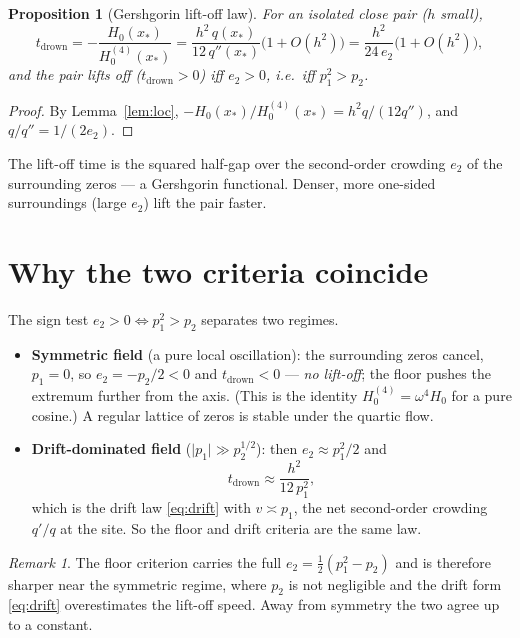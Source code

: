 \documentclass[11pt]{article}
\theoremstyle{plain}
\newtheorem{proposition}{Proposition}
\theoremstyle{definition}
\theoremstyle{remark}
\newtheorem{remark}{Remark}
\newcommand{\abs}[1]{\lvert #1\rvert}
\begin{document}
\begin{proposition}[Gershgorin lift-off law]\label{prop:law}
For an isolated close pair ($h$ small),
\begin{equation}\label{eq:law}
  t_{\mathrm{drown}}=-\frac{H_0(x_*)}{H_0^{(4)}(x_*)}
   =\frac{h^2\,q(x_*)}{12\,q''(x_*)}\bigl(1+O(h^2)\bigr)
   =\frac{h^2}{24\,e_2}\bigl(1+O(h^2)\bigr),
\end{equation}
and the pair lifts off ($t_{\mathrm{drown}}>0$) iff $e_2>0$, i.e.\ iff
$p_1^2>p_2$.
\end{proposition}
\begin{proof}
By Lemma~\ref{lem:loc}, $-H_0(x_*)/H_0^{(4)}(x_*)=h^2q/(12q'')$, and
$q/q''=1/(2e_2)$.
\end{proof}

The lift-off time is the squared half-gap over the second-order crowding $e_2$ of
the surrounding zeros --- a Gershgorin functional. Denser, more one-sided
surroundings (large $e_2$) lift the pair faster.

\section{Why the two criteria coincide}
The sign test $e_2>0\iff p_1^2>p_2$ separates two regimes.
\begin{itemize}
\item \textbf{Symmetric field} (a pure local oscillation): the surrounding zeros
cancel, $p_1=0$, so $e_2=-p_2/2<0$ and $t_{\mathrm{drown}}<0$ --- \emph{no
lift-off}; the floor pushes the extremum further from the axis. (This is the
identity $H_0^{(4)}=\omega^4H_0$ for a pure cosine.) A regular lattice of zeros is
stable under the quartic flow.
\item \textbf{Drift-dominated field} ($\abs{p_1}\gg p_2^{1/2}$): then
$e_2\approx p_1^2/2$ and
\begin{equation}\label{eq:reconcile}
   t_{\mathrm{drown}}\approx\frac{h^2}{12\,p_1^{2}},
\end{equation}
which is the drift law \eqref{eq:drift} with $v\asymp p_1$, the net second-order
crowding $q'/q$ at the site. So the floor and drift criteria are the same law.
\end{itemize}

\begin{remark}
The floor criterion carries the full $e_2=\tfrac12(p_1^2-p_2)$ and is therefore
sharper near the symmetric regime, where $p_2$ is not negligible and the drift
form \eqref{eq:drift} overestimates the lift-off speed. Away from symmetry the two
agree up to a constant.
\end{remark}
\end{document}
